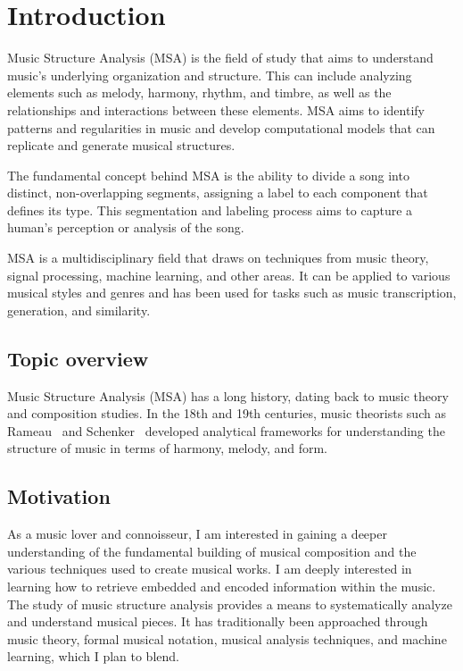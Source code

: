 \normallinespacing

\chapter{Introduction}

Music Structure Analysis (MSA) is the field of study that aims to understand music's underlying organization and structure. This can include analyzing elements such as melody, harmony, rhythm, and timbre, as well as the relationships and interactions between these elements. MSA aims to identify patterns and regularities in music and develop computational models that can replicate and generate musical structures.

The fundamental concept behind MSA is the ability to divide a song into distinct, non-overlapping segments, assigning a label to each component that defines its type. This segmentation and labeling process aims to capture a human's perception or analysis of the song.

MSA is a multidisciplinary field that draws on techniques from music theory, signal processing, machine learning, and other areas. It can be applied to various musical styles and genres and has been used for tasks such as music transcription, generation, and similarity. 

\section{Topic overview}

Music Structure Analysis (MSA) has a long history, dating back to music theory and composition studies. In the 18th and 19th centuries, music theorists such as Rameau~\cite{christensen2004rameau} and Schenker~\cite{schenkerdocumentsonline} developed analytical frameworks for understanding the structure of music in terms of harmony, melody, and form.

\section{Motivation}

As a music lover and connoisseur, I am interested in gaining a deeper understanding of the fundamental building of musical composition and the various techniques used to create musical works. I am deeply interested in learning how to retrieve embedded and encoded information within the music. The study of music structure analysis provides a means to systematically analyze and understand musical pieces. It has traditionally been approached through music theory, formal musical notation, musical analysis techniques, and machine learning, which I plan to blend.

